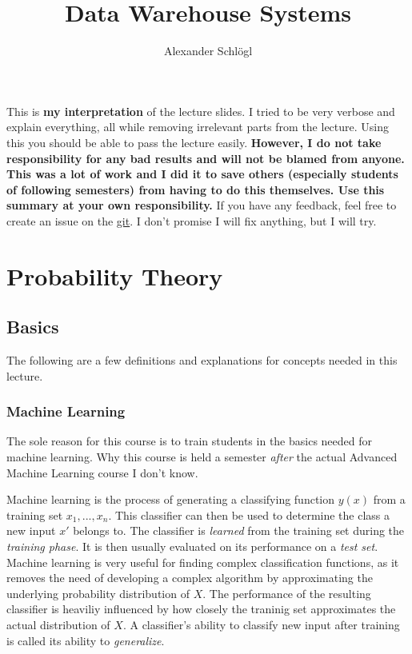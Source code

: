 \documentclass{article}
\title{Data Warehouse Systems}
\author{Alexander Schlögl}
\begin{document}
\maketitle

\tableofcontents

This is \textbf{my interpretation} of the lecture slides.
I tried to be very verbose and explain everything, all while removing irrelevant parts from the lecture.
Using this you should be able to pass the lecture easily.
\large{\textbf{However, I do not take responsibility for any bad results and will not be blamed from anyone.
This was a lot of work and I did it to save others (especially students of following semesters) from having to do this themselves.
Use this summary at your own responsibility.}}
If you have any feedback, feel free to create an issue on the \href{https://github.com/alxshine/lecture-notes}{git}.
I don't promise I will fix anything, but I will try.
\newpage

\section{Probability Theory}
\subsection{Basics}
The following are a few definitions and explanations for concepts needed in this lecture.

\subsubsection{Machine Learning}
The sole reason for this course is to train students in the basics needed for machine learning.
Why this course is held a semester \emph{after} the actual Advanced Machine Learning course I don't know.

Machine learning is the process of generating a classifying function $y(x)$ from a training set ${x_1, ..., x_n}$.
This classifier can then be used to determine the class a new input $x'$ belongs to.
The classifier is \emph{learned} from the training set during the \emph{training phase}.
It is then usually evaluated on its performance on a \emph{test set}.
Machine learning is very useful for finding complex classification functions, as it removes the need of developing a complex algorithm by approximating the underlying probability distribution of $X$.
The performance of the resulting classifier is heaviliy influenced by how closely the traninig set approximates the actual distribution of $X$.
A classifier's ability to classify new input after training is called its ability to \emph{generalize}.
\end{document}
